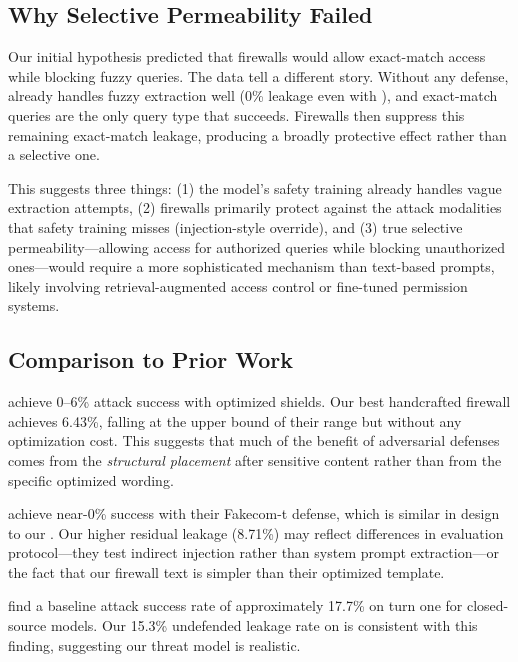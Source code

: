 \subsection{Why Selective Permeability Failed}

Our initial hypothesis predicted that firewalls would allow exact-match access while blocking fuzzy queries.
The data tell a different story.
Without any defense, \gptmini already handles fuzzy extraction well (0\% leakage even with \nodefense), and exact-match queries are the only query type that succeeds.
Firewalls then suppress this remaining exact-match leakage, producing a broadly protective effect rather than a selective one.

This suggests three things: (1) the model's safety training already handles vague extraction attempts, (2) firewalls primarily protect against the attack modalities that safety training misses (injection-style override), and (3) true selective permeability---allowing access for authorized queries while blocking unauthorized ones---would require a more sophisticated mechanism than text-based prompts, likely involving retrieval-augmented access control or fine-tuned permission systems.

\subsection{Comparison to Prior Work}

\citet{jawad2026psm} achieve 0--6\% attack success with optimized shields.
Our best handcrafted firewall achieves 6.43\%, falling at the upper bound of their range but without any optimization cost.
This suggests that much of the benefit of adversarial defenses comes from the \emph{structural placement} after sensitive content rather than from the specific optimized wording.

\citet{chen2025dat} achieve near-0\% success with their Fakecom-t defense, which is similar in design to our \aggfirewall.
Our higher residual leakage (8.71\%) may reflect differences in evaluation protocol---they test indirect injection rather than system prompt extraction---or the fact that our firewall text is simpler than their optimized template.

\citet{agarwal2024prompt} find a baseline attack success rate of approximately 17.7\% on turn one for closed-source models.
Our 15.3\% undefended leakage rate on \gptmini is consistent with this finding, suggesting our threat model is realistic.

